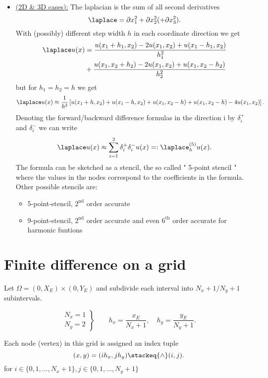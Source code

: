\begin{itemize}
	\item \underline{(2D \& 3D cases):} 
		The laplacian is the sum of all second derivatives
		\[
			\laplace = \partial x_1^2 + \partial x_2^2 (+\partial x_3^2)
		.\] 
		With (possibly) different step width $h$ in each coordinate direction we get
		\begin{align*}
			\laplace u(x) &= \frac{u(x_1 + h_1, x_2) - 2u(x_1, x_2) + u(x_1 -h_1, x_2)}{h_1^2}\\
						  &+ \frac{u(x_1, x_2 + h_2) - 2u(x_1, x_2) + u(x_1, x_2 -h_2)}{h_2^2}
		\end{align*}
		but for $h_1 = h_2 = h$ we get
		\[
			\laplace u(x) \approx \frac{1}{h^2}\left[u(x_1+ h, x_2) + u(x_1-h, x_2) + u(x_1, x_2 -h) + u(x_1, x_2 -h) -4u(x_1, x_2)\right]
		.\] 
		Denoting the forward/backward difference formulas
		in the direction i by $\delta_{i}^{+}$ and $\delta_{i}^{-}$ we can write
		\[
			\laplace u(x) \approx \sum_{i=1}^{2}{\delta_{i}^{+}\delta_{i}^{-}u(x)}=:\laplace_{h}^{(5)}u(x)
		.\] 
		The formula can be sketched as a stencil, the so called " 5-point stencil "
		where the values in the nodes correspond to the coefficients in the formula.
		Other possible stencils are:
		\begin{itemize}
			\item 5-point-stencil, $2^{\text{nd}}$ order accurate
			\item 9-point-stencil,  $2^{\text{nd}}$ order accurate and even $6^{\text{th}}$ order accurate for harmonic funtions
		\end{itemize}
\end{itemize}

\section{Finite difference on a grid}%
\label{sec:Finite difference on a grid}
Let $\Omega =(0, X_{E}) \times (0,Y_{E})$ and subdivide each interval into $N_{x}+1 / N_{y} + 1$ subintervals.

\[
\left.
	\begin{array}{c}
	N_{x} = 1 \\
	N_{y} = 2
\end{array}
\right\} \qquad
h_{x} = \frac{x_{E}}{N_{x}+1}, \quad h_{y}= \frac{y_{E}}{N_{y}+1}
.\] 

%
Each node (vertex) in this grid is assigned an index tuple
\[
	(x,y) = (ih_{x}, jh_{y}) \stackeq{\wedge} (i,j)
.\] 
for $i \in \{0,1, \ldots , N_{x}+1\}, j \in  \{0,1, \ldots , N_{y}+1\}$

